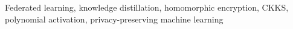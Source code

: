 \documentclass[lettersize,journal]{IEEEtran}
\begin{document}



\begin{IEEEkeywords}
Federated learning, knowledge distillation, homomorphic encryption, CKKS, polynomial activation, privacy-preserving machine learning
\end{IEEEkeywords}














\end{document}
